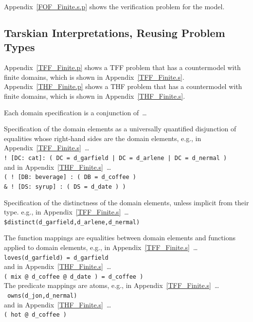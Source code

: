 \documentclass{easychair}
\newcommand{\smalltt}[1]{\small \texttt{#1}}
\newenvironment{packed_itemize}{
\vspace*{-0.3em}
\begin{itemize}
\setlength{\partopsep}{0pt}
\setlength{\itemsep}{1pt}
\setlength{\parskip}{0pt}
\setlength{\parsep}{0pt}
}{\end{itemize}}
\begin{document}
Appendix~\ref{FOF_Finite.s.p} shows the verification problem for the model.

\subsection{Tarskian Interpretations, Reusing Problem Types}
\label{TarskianReusingTypes}

Appendix~\ref{TFF_Finite.p} shows a TFF problem that has a countermodel with finite domains,
which is shown in Appendix~\ref{TFF_Finite.s}.
Appendix~\ref{THF_Finite.p} shows a THF problem that has a countermodel with finite domains,
which is shown in Appendix~\ref{THF_Finite.s}.

Each domain specification is a conjunction of~\ldots
\begin{packed_itemize}
\item Specification of the domain elements as a universally quantified disjunction of equalities 
      whose right-hand sides are the domain elements, 
      e.g., in Appendix~\ref{TFF_Finite.s}~\ldots\\
      \hspace*{0.5cm}\smalltt{! [DC: cat]: ( DC = d\_garfield | DC = d\_arlene | DC = d\_nermal )}\\
      and in Appendix~\ref{THF_Finite.s}~\ldots\\
      \hspace*{0.5cm}\smalltt{( ! [DB: beverage] : ( DB = d\_coffee )}\\
      \hspace*{0.5cm}\smalltt{\& ! [DS: syrup] : ( DS = d\_date ) )}\\
\item Specification of the distinctness of the domain elements, unless implicit from their type.
      e.g., in Appendix~\ref{TFF_Finite.s}~\ldots\\
      \hspace*{0.5cm}\smalltt{\$distinct(d\_garfield,d\_arlene,d\_nermal)}
\end{packed_itemize}

The function mappings are equalities between domain elements and functions applied to domain 
elements, 
e.g., in Appendix~\ref{TFF_Finite.s}~\ldots \\
\hspace*{0.5cm}\smalltt{loves(d\_garfield) = d\_garfield}\\
and in Appendix~\ref{THF_Finite.s}~\ldots \\
\hspace*{0.5cm}\smalltt{( mix @ d\_coffee @ d\_date ) = d\_coffee )}\\
The predicate mappings are atoms, 
e.g., in Appendix~\ref{TFF_Finite.s}~\ldots \\
\hspace*{0.5cm}\smalltt{{\raisebox{0.4ex}{\texttildelow}}\,owns(d\_jon,d\_nermal)}\\
and in Appendix~\ref{THF_Finite.s}~\ldots \\
\hspace*{0.5cm}\smalltt{( hot @ d\_coffee )}
\end{document}
